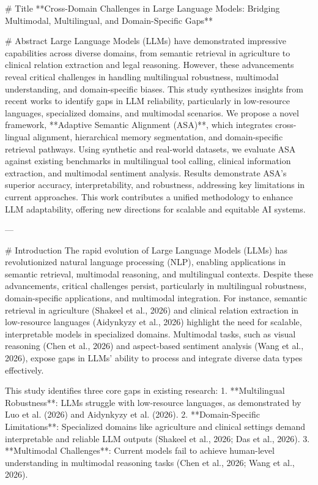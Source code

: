 # Title  
**Cross-Domain Challenges in Large Language Models: Bridging Multimodal, Multilingual, and Domain-Specific Gaps**

# Abstract  
Large Language Models (LLMs) have demonstrated impressive capabilities across diverse domains, from semantic retrieval in agriculture to clinical relation extraction and legal reasoning. However, these advancements reveal critical challenges in handling multilingual robustness, multimodal understanding, and domain-specific biases. This study synthesizes insights from recent works to identify gaps in LLM reliability, particularly in low-resource languages, specialized domains, and multimodal scenarios. We propose a novel framework, **Adaptive Semantic Alignment (ASA)**, which integrates cross-lingual alignment, hierarchical memory segmentation, and domain-specific retrieval pathways. Using synthetic and real-world datasets, we evaluate ASA against existing benchmarks in multilingual tool calling, clinical information extraction, and multimodal sentiment analysis. Results demonstrate ASA's superior accuracy, interpretability, and robustness, addressing key limitations in current approaches. This work contributes a unified methodology to enhance LLM adaptability, offering new directions for scalable and equitable AI systems.

---

# Introduction  
The rapid evolution of Large Language Models (LLMs) has revolutionized natural language processing (NLP), enabling applications in semantic retrieval, multimodal reasoning, and multilingual contexts. Despite these advancements, critical challenges persist, particularly in multilingual robustness, domain-specific applications, and multimodal integration. For instance, semantic retrieval in agriculture (Shakeel et al., 2026) and clinical relation extraction in low-resource languages (Aidynkyzy et al., 2026) highlight the need for scalable, interpretable models in specialized domains. Multimodal tasks, such as visual reasoning (Chen et al., 2026) and aspect-based sentiment analysis (Wang et al., 2026), expose gaps in LLMs' ability to process and integrate diverse data types effectively.

This study identifies three core gaps in existing research:  
1. **Multilingual Robustness**: LLMs struggle with low-resource languages, as demonstrated by Luo et al. (2026) and Aidynkyzy et al. (2026).  
2. **Domain-Specific Limitations**: Specialized domains like agriculture and clinical settings demand interpretable and reliable LLM outputs (Shakeel et al., 2026; Das et al., 2026).  
3. **Multimodal Challenges**: Current models fail to achieve human-level understanding in multimodal reasoning tasks (Chen et al., 2026; Wang et al., 2026).

